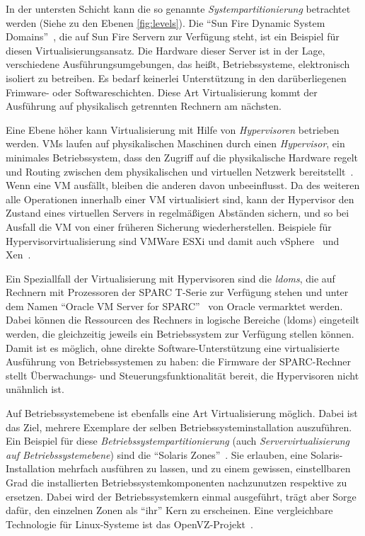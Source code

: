 In der untersten Schicht kann die so genannte
\emph{Systempartitionierung} betrachtet werden (Siehe zu den Ebenen
\autoref{fig:levels}). Die "`Sun Fire Dynamic System
Domains"'~\cite{Shoumack2007:Beginners-Guid-}, die auf Sun Fire
Servern zur Verfügung steht, ist ein Beispiel für diesen
Virtualisierungsansatz. Die Hardware dieser Server ist in der Lage,
verschiedene Ausführungsumgebungen, das heißt, Betriebssysteme,
elektronisch isoliert zu betreiben. Es bedarf keinerlei Unterstützung
in den darüberliegenen Frimware- oder Softwareschichten. Diese Art
Virtualisierung kommt der Ausführung auf physikalisch getrennten
Rechnern am nächsten.

Eine Ebene höher kann Virtualisierung mit Hilfe von
\emph{Hypervisoren} betrieben werden. \acfp{VM} laufen auf
physikalischen Maschinen durch einen \emph{Hypervisor}, ein minimales
Betriebssystem, dass den Zugriff auf die physikalische Hardware regelt
und Routing zwischen dem physikalischen und virtuellen Netzwerk
bereitstellt~\cite{tanenbaum1992modern}. Wenn eine \ac{VM} ausfällt,
bleiben die anderen davon unbeeinflusst. Da des weiteren alle
Operationen innerhalb einer \ac{VM} virtualisiert sind, kann der Hypervisor
den Zustand eines virtuellen Servers in regelmäßigen Abständen
sichern, und so bei Ausfall die \ac{VM} von einer früheren Sicherung
wiederherstellen. Beispiele für Hypervisorvirtualisierung sind VMWare
ESXi und damit auch vSphere~\cite{:Free-VMware-vSp} und Xen~\cite{Barham:2003:XAV:945445.945462}.

Ein Speziallfall der Virtualisierung mit Hypervisoren sind die
\emph{\acfp{ldom}}, die auf Rechnern mit Prozessoren der SPARC T-Serie
zur Verfügung stehen und unter dem Namen "`Oracle VM Server for
SPARC"'~\cite{Corporation:Oracle-VM-Serve} von Oracle vermarktet
werden. Dabei können die Ressourcen des Rechners in logische Bereiche
(\aclp{ldom}) eingeteilt werden, die gleichzeitig jeweils ein
Betriebssystem zur Verfügung stellen können. Damit ist es möglich,
ohne direkte Software-Unterstützung eine virtualisierte Ausführung
von Betriebssystemen zu haben: die Firmware der SPARC-Rechner stellt
Überwachungs- und Steuerungsfunktionalität bereit, die Hypervisoren
nicht unähnlich ist.

Auf Betriebssystemebene ist ebenfalls eine Art Virtualisierung
möglich. Dabei ist das Ziel, mehrere Exemplare der selben
Betriebssysteminstallation auszuführen. Ein Beispiel für diese
\emph{Betriebssystempartitionierung} (auch \emph{Servervirtualisierung
  auf Betriebssystemebene}) sind die "`Solaris
Zones"'~\cite{price2004solaris}. Sie erlauben, eine
Solaris-Installation mehrfach ausführen zu lassen, und zu einem
gewissen, einstellbaren Grad die installierten
Betriebssystemkomponenten nachzunutzen respektive zu ersetzen. Dabei
wird der Betriebssystemkern einmal ausgeführt, trägt aber Sorge dafür,
den einzelnen Zonen als "`ihr"' Kern zu erscheinen. Eine vergleichbare
Technologie für Linux-Systeme ist das
OpenVZ-Projekt~\cite{ahmed2008server}.

